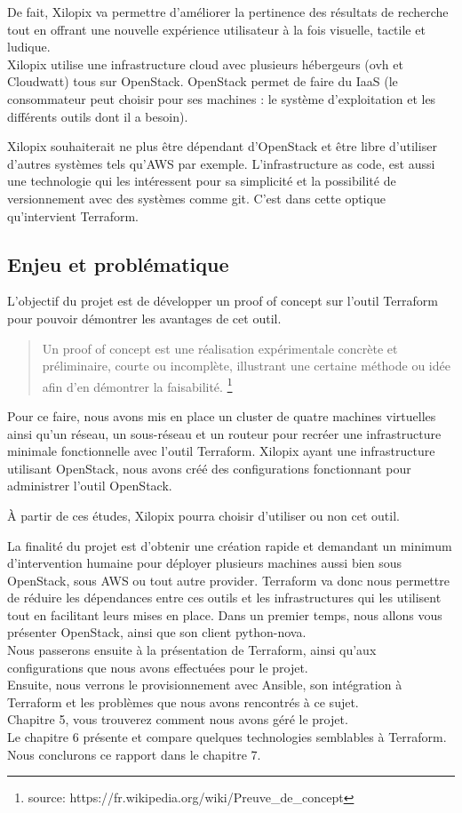 \documentclass[]{article}
\begin{document}
De fait, Xilopix va permettre d'améliorer la pertinence des
résultats de recherche tout en offrant une nouvelle expérience
utilisateur à la fois visuelle, tactile et ludique.\\
Xilopix utilise une infrastructure cloud avec plusieurs hébergeurs (ovh et Cloudwatt) tous sur OpenStack. OpenStack permet de faire du IaaS (le consommateur peut choisir pour ses machines : le système d'exploitation et les différents
outils dont il a besoin). 

Xilopix souhaiterait ne plus être
dépendant d'OpenStack et être libre d'utiliser d'autres systèmes tels qu'AWS par exemple. L'infrastructure as code, est aussi une technologie qui les intéressent pour sa simplicité et la possibilité de versionnement avec des systèmes comme git. C'est dans cette optique qu'intervient Terraform.

\subsection{Enjeu et problématique}\label{enjeu-et-probluxe9matique}
L'objectif du projet est de développer un proof of concept sur l'outil
Terraform pour pouvoir démontrer les avantages de cet outil.

\begin{quote}
Un proof of concept est une réalisation expérimentale concrète et
préliminaire, courte ou incomplète, illustrant une certaine méthode ou
idée afin d'en démontrer la faisabilité. \footnote{source: https://fr.wikipedia.org/wiki/Preuve\_de\_concept}
\end{quote}

Pour ce faire, nous avons mis en place un cluster de quatre machines
virtuelles ainsi qu'un réseau, un sous-réseau et un routeur pour recréer
une infrastructure minimale fonctionnelle avec l'outil Terraform.
Xilopix ayant une infrastructure utilisant OpenStack, nous avons créé
des configurations fonctionnant pour administrer l'outil OpenStack.

À partir de ces études, Xilopix pourra choisir d'utiliser ou non cet
outil.

La finalité du projet est d'obtenir une création rapide et demandant un
minimum d'intervention humaine pour déployer plusieurs machines aussi
bien sous OpenStack, sous AWS ou tout autre provider. Terraform va donc
nous permettre de réduire les dépendances entre ces outils et les
infrastructures qui les utilisent tout en facilitant leurs mises en place.
\vspace{0,5cm}
Dans un premier temps, nous allons vous présenter OpenStack, ainsi que son client python-nova.\\
Nous passerons ensuite à la présentation de Terraform, ainsi qu'aux configurations que nous avons effectuées pour le projet.\\
Ensuite, nous verrons le provisionnement avec Ansible, son intégration à Terraform et les problèmes que nous avons rencontrés  à ce sujet. \\
Chapitre 5, vous trouverez comment nous avons géré le projet.\\
Le chapitre 6 présente et compare quelques technologies semblables à Terraform. \\
Nous conclurons ce rapport dans le chapitre 7.
\end{document}
